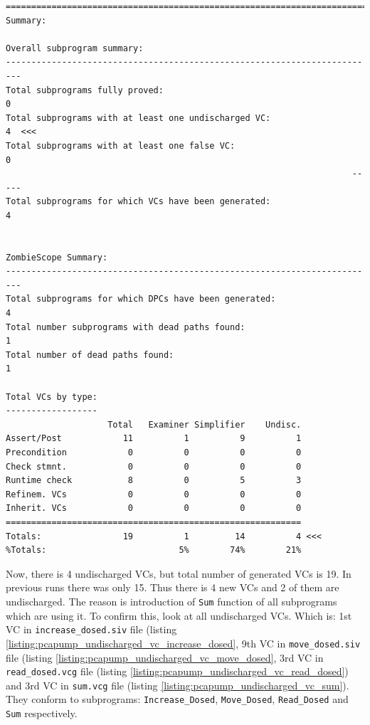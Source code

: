 \begin{lstlisting}[frame=single, gobble=0, caption={Third POGS report}]
===============================================================================
Summary:

Overall subprogram summary:
-------------------------------------------------------------------------
Total subprograms fully proved:                                         0
Total subprograms with at least one undischarged VC:                    4  <<<
Total subprograms with at least one false VC:                           0
                                                                    -----
Total subprograms for which VCs have been generated:                    4


ZombieScope Summary:
-------------------------------------------------------------------------
Total subprograms for which DPCs have been generated:                   4
Total number subprograms with dead paths found:                         1
Total number of dead paths found:                                       1

Total VCs by type:
------------------
                    Total   Examiner Simplifier    Undisc.
Assert/Post            11          1          9          1
Precondition            0          0          0          0
Check stmnt.            0          0          0          0
Runtime check           8          0          5          3
Refinem. VCs            0          0          0          0
Inherit. VCs            0          0          0          0
==========================================================
Totals:                19          1         14          4 <<<
%Totals:                          5%        74%        21%
\end{lstlisting}
\label{listing:pcapump_dosemonitor_pogs3}
\doublespacing

Now, there is 4 undischarged VCs, but total number of generated VCs is 19. In previous runs there was only 15. Thus there is 4 new VCs and 2 of them are undischarged. The reason is introduction of \lstinline{Sum} function of all subprograms which are using it. To confirm this, look at all undischarged VCs. Which is: 1st VC in \lstinline{increase_dosed.siv} file (listing \ref{listing:pcapump_undischarged_vc_increase_dosed}, 9th VC in \lstinline{move_dosed.siv} file (listing \ref{listing:pcapump_undischarged_vc_move_dosed}, 3rd VC in \lstinline{read_dosed.vcg} file (listing \ref{listing:pcapump_undischarged_vc_read_dosed}) and 3rd VC in \lstinline{sum.vcg} file (listing \ref{listing:pcapump_undischarged_vc_sum}). They conform to subprograms: \lstinline{Increase_Dosed}, \lstinline{Move_Dosed}, \lstinline{Read_Dosed} and \lstinline{Sum} respectively.

